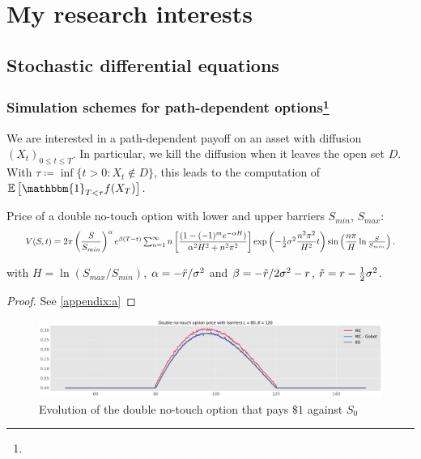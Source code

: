 \section{My research interests}

\subsection{Stochastic differential equations}

\subsubsection*{Simulation schemes for path-dependent options\footnote{}}

We are interested in a path-dependent payoff on an asset with diffusion $(X_t)_{0\leq t \leq T}$.
In particular, we kill the diffusion when it leaves the open set $D$.
\newline With $\tau \coloneqq \inf\{t > 0 : X_t \notin D\}$, this leads to the computation of $\mathbb{E}\left[\mathbbm{1}_{T < \tau} f(X_T)\right].$

\begin{proposition}
    Price of a double no-touch option with lower and upper barriers $S_{min}$, $S_{max}$:
\begin{equation*}
    \resizebox{.95\hsize}{!}{$V(S,t) = 2\pi \left(\dfrac{S}{S_{min}}\right)^{\alpha} e^{\beta(T-t)} \sum_{n=1}^{\infty} n \left[\dfrac{(1 - (-1)^{m}e^{-\alpha H})}{\alpha^2 H^2 + n^2 \pi^2} \right] \exp \left(-\frac{1}{2}\sigma^2 \dfrac{n^2 \pi^2}{H^2} t \right) \sin \left(\dfrac{n\pi}{H} \ln \frac{S}{S_{min}} \right).$}
\end{equation*}

with $H=\ln(S_{max}/S_{min})$, $\alpha = -\Tilde{r}/\sigma^2$ and $\beta = -\Tilde{r}/ 2\sigma^2 - r$, $\Tilde{r} = r - \frac{1}{2}\sigma^2$.
\end{proposition}

\begin{proof}
    See \ref{appendix:a}
\end{proof}

\begin{figure}[H]
    \centering
    \includegraphics[width=1\linewidth]{img/dnt_mc.pdf}
    \caption{Evolution of the double no-touch option that pays $\$1$ against $S_0$}
    \label{fig:doublenotouchmc}
\end{figure}

